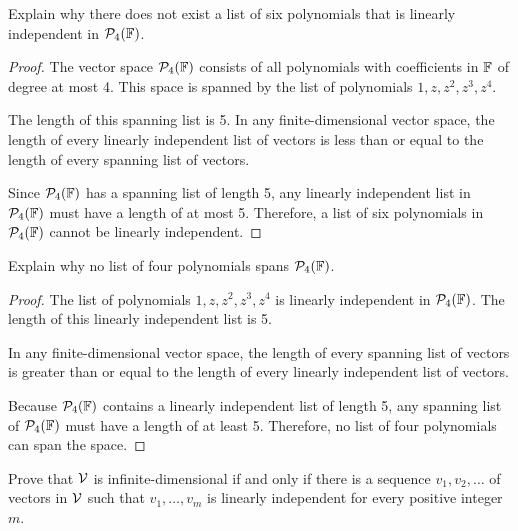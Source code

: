 \begin{question}
	Explain why there does not exist a list of six polynomials that is linearly independent in $\mathcal{P}_4(\mathbb{F})$.
\end{question}
\begin{proof}
	The vector space $\mathcal{P}_4(\mathbb{F})$ consists of all polynomials with coefficients in $\mathbb{F}$ of degree at most 4. This space is spanned by the list of polynomials $1, z, z^2, z^3, z^4$.
	
	The length of this spanning list is 5. In any finite-dimensional vector space, the length of every linearly independent list of vectors is less than or equal to the length of every spanning list of vectors. 
	
	Since $\mathcal{P}_4(\mathbb{F})$ has a spanning list of length 5, any linearly independent list in $\mathcal{P}_4(\mathbb{F})$ must have a length of at most 5. Therefore, a list of six polynomials in $\mathcal{P}_4(\mathbb{F})$ cannot be linearly independent.
\end{proof}
\begin{question}
	Explain why no list of four polynomials spans $\mathcal{P}_4(\mathbb{F})$.
\end{question}
\begin{proof}
	The list of polynomials $1, z, z^2, z^3, z^4$ is linearly independent in $\mathcal{P}_4(\mathbb{F})$. The length of this linearly independent list is 5. 
	
	In any finite-dimensional vector space, the length of every spanning list of vectors is greater than or equal to the length of every linearly independent list of vectors. 
	
	Because $\mathcal{P}_4(\mathbb{F})$ contains a linearly independent list of length 5, any spanning list of $\mathcal{P}_4(\mathbb{F})$ must have a length of at least 5. Therefore, no list of four polynomials can span the space.
\end{proof}
\begin{question}
	Prove that $\mathcal{V}$ is infinite-dimensional if and only if there is a sequence $v_1, v_2, \dots$ of vectors in $\mathcal{V}$ such that $v_1, \dots, v_m$ is linearly independent for every positive integer $m$.
\end{question}
